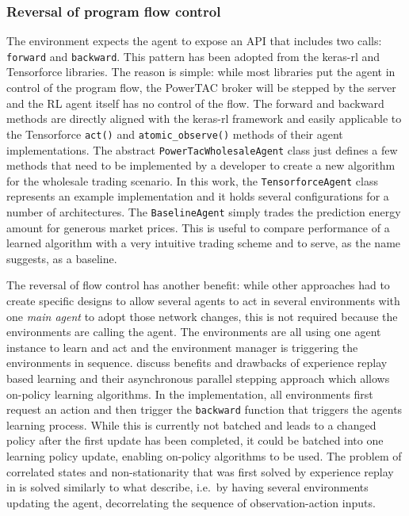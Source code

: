 \subsubsection{Reversal of program flow control}%
\label{sub:reversal_of_flow_control}

The environment expects the agent to expose an \ac{API} that includes two calls: \texttt{forward} and
\texttt{backward}. This pattern has been adopted from the keras-rl and Tensorforce libraries. The reason is simple:
while most libraries put the agent in control of the program flow, the \ac{PowerTAC} broker will be stepped by the
server and the \ac{RL} agent itself has no control of the flow. The forward and backward methods are
directly aligned with the keras-rl framework and easily applicable to the Tensorforce \texttt{act()} and
\texttt{atomic\_observe()} methods of their agent implementations. The abstract \texttt{PowerTacWholesaleAgent} class just defines a
few methods that need to be implemented by a developer to create a new algorithm for the wholesale trading
scenario. In this work, the \texttt{TensorforceAgent} class represents an example implementation and it holds several
configurations for a number of architectures. The \texttt{BaselineAgent} simply trades the prediction
energy amount for generous market prices. This is useful to compare performance of a learned algorithm with a very
intuitive trading scheme and to serve, as the name suggests, as a baseline.

The reversal of flow control has another benefit: while other approaches had to create specific designs to allow 
several agents to act in several environments with one \emph{main agent} to adopt those network changes, this is not
required because the environments are calling the agent. The environments are all using one agent instance to learn and
act and the environment manager is triggering the environments in sequence. \citet{mnih2016asynchronous} discuss 
benefits and drawbacks of experience replay based learning and their asynchronous parallel stepping approach which
allows on-policy learning algorithms. In the implementation, all environments first request an action and then trigger
the \texttt{backward} function that triggers the agents learning process. While this is currently not batched and
leads to a changed policy after the first update has been completed, it could be batched into
one learning policy update, enabling on-policy algorithms to be used. The problem of correlated states and
non-stationarity that was first solved by experience replay in \citep{mnih2013playing} is solved similarly to what
\citet{mnih2016asynchronous} describe, i.e.\ by having several environments updating the agent, decorrelating the
sequence of observation-action inputs.


